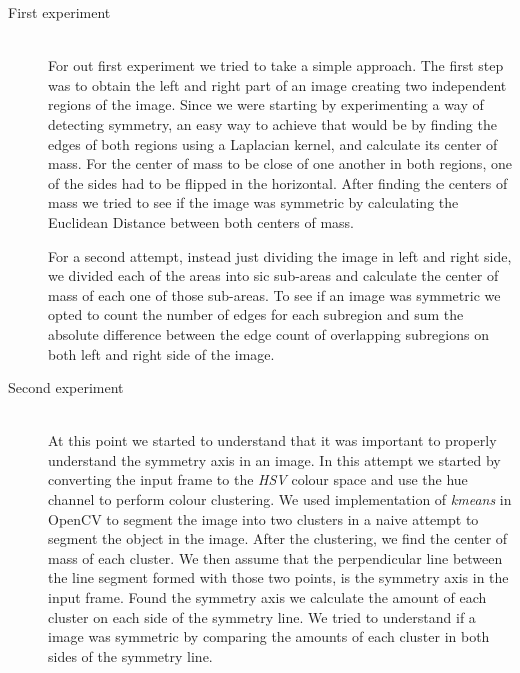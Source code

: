 \begin{description}
	\item[First experiment] \hfill \\
	For out first experiment we tried to take a simple approach. The first step was to obtain the left and right part of an image creating two independent regions of the image. Since we were starting by experimenting a way of detecting symmetry, an easy way to achieve that would be by finding the edges of both regions using a Laplacian kernel, and calculate its center of mass. For the center of mass to be close of one another in both regions, one of the sides had to be flipped in the horizontal. After finding the centers of mass we tried to see if the image was symmetric by calculating the Euclidean Distance between both centers of mass.
	
	For a second attempt, instead just dividing the image in left and right side, we divided each of the areas into sic sub-areas and calculate the center of mass of each one of those sub-areas. To see if an image was symmetric we opted to count the number of edges for each subregion and sum the absolute difference between the edge count of overlapping subregions on both left and right side of the image.
	
	\item[Second experiment] \hfill \\
	At this point we started to understand that it was important to properly understand the symmetry axis in an image. In this attempt we started by converting the input frame to the \emph{HSV} colour space and use the hue channel to perform colour clustering. We used implementation of \emph{kmeans} in OpenCV \cite{OCV} to segment the image into two clusters in a naive attempt to segment the object in the image. After the clustering, we find the center of mass of each cluster. We then assume that the perpendicular line between the line segment formed with those two points, is the symmetry axis in the input frame. Found the symmetry axis we calculate the amount of each cluster on each side of the symmetry line. We tried to understand if a image was symmetric by comparing the amounts of each cluster in both sides of the symmetry line.


\end{description}
